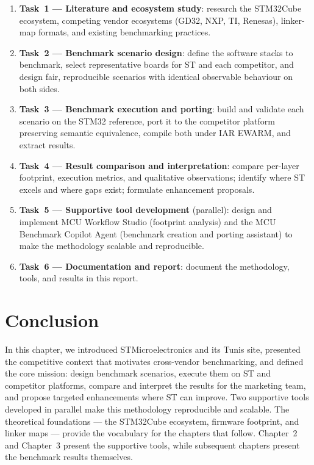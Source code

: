 \begin{enumerate}
\item \textbf{Task~1 --- Literature and ecosystem study}: research the STM32Cube
ecosystem, competing vendor ecosystems (GD32, NXP, TI, Renesas), linker-map formats,
and existing benchmarking practices.
\item \textbf{Task~2 --- Benchmark scenario design}: define the software stacks to
benchmark, select representative boards for ST and each competitor, and design fair,
reproducible scenarios with identical observable behaviour on both sides.
\item \textbf{Task~3 --- Benchmark execution and porting}: build and validate each
scenario on the STM32 reference, port it to the competitor platform preserving semantic
equivalence, compile both under IAR EWARM, and extract results.
\item \textbf{Task~4 --- Result comparison and interpretation}: compare per-layer
footprint, execution metrics, and qualitative observations; identify where ST excels and
where gaps exist; formulate enhancement proposals.
\item \textbf{Task~5 --- Supportive tool development} (parallel): design and implement
MCU Workflow Studio (footprint analysis) and the MCU Benchmark Copilot Agent (benchmark
creation and porting assistant) to make the methodology scalable and reproducible.
\item \textbf{Task~6 --- Documentation and report}: document the methodology, tools, and
results in this report.
\end{enumerate}

\section*{Conclusion}

In this chapter, we introduced STMicroelectronics and its Tunis site, presented the
competitive context that motivates cross-vendor benchmarking, and defined the core mission:
design benchmark scenarios, execute them on ST and competitor platforms, compare and
interpret the results for the marketing team, and propose targeted enhancements where ST can
improve. Two supportive tools developed in parallel make this methodology reproducible and
scalable. The theoretical foundations --- the STM32Cube ecosystem, firmware footprint, and
linker maps --- provide the vocabulary for the chapters that follow. Chapter~2 and
Chapter~3 present the supportive tools, while subsequent chapters present the benchmark
results themselves.
